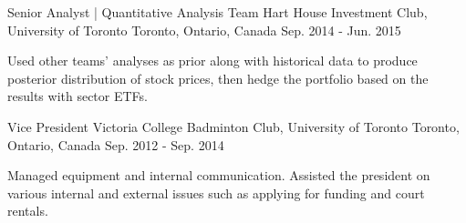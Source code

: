 

\begin{cventries}

  \cventry
    {Senior Analyst | Quantitative Analysis Team} %
    {Hart House Investment Club, University of Toronto} %
    {Toronto, Ontario, Canada} %
    {Sep. 2014 - Jun. 2015} %
    {
      \begin{cvitems} %
        \item {Used other teams’ analyses as prior along with historical data to produce posterior distribution of stock prices, then hedge the portfolio based on the results with sector ETFs.}
      \end{cvitems}
    }
\end{cventries}

\begin{cventries}
  \cventry
    {Vice President} %
    {Victoria College Badminton Club, University of Toronto} %
    {Toronto, Ontario, Canada} %
    {Sep. 2012 - Sep. 2014} %
    {
      \begin{cvitems} %
        \item {Managed equipment and internal communication. Assisted the president on various internal and external issues such as applying for funding and court rentals.}
      \end{cvitems}
    }

\end{cventries}
